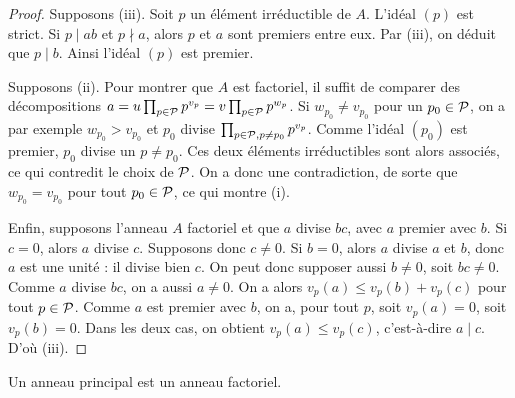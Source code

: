 \documentclass[]{report}
\begin{document}
\begin{proof}{}{}
    Supposons (iii). Soit $p$ un élément irréductible de $A$. L'idéal $(p)$ est strict. Si $p \mid ab$ et $p \nmid a$, alors $p$ et $a$ sont premiers entre eux. Par (iii), on déduit que $p \mid b$. Ainsi l'idéal $(p)$ est premier.

    Supposons (ii). Pour montrer que $A$ est factoriel, il suffit de comparer des décompositions $a = u \prod_{p \in \mathcal{P}} p^{v_p} = v \prod_{p \in \mathcal{P}} p^{w_p}$. Si $w_{p_0} \neq v_{p_0}$ pour un $p_0 \in \mathcal{P}$, on a par exemple $w_{p_0} > v_{p_0}$ et $p_0$ divise $\prod_{p \in \mathcal{P}, p \neq p_0} p^{v_p}$. Comme l'idéal $(p_0)$ est premier, $p_0$ divise un $p \neq p_0$. Ces deux éléments irréductibles sont alors associés, ce qui contredit le choix de $\mathcal{P}$. On a donc une contradiction, de sorte que $w_{p_0} = v_{p_0}$ pour tout $p_0 \in \mathcal{P}$, ce qui montre (i).

    Enfin, supposons l'anneau $A$ factoriel et que $a$ divise $bc$, avec $a$ premier avec $b$. Si $c = 0$, alors $a$ divise $c$. Supposons donc $c \neq 0$. Si $b = 0$, alors $a$ divise $a$ et $b$, donc $a$ est une unité : il divise bien $c$. On peut donc supposer aussi $b \neq 0$, soit $bc \neq 0$. Comme $a$ divise $bc$, on a aussi $a \neq 0$. On a alors $v_p(a) \le v_p(b) + v_p(c)$ pour tout $p \in \mathcal{P}$. Comme $a$ est premier avec $b$, on a, pour tout $p$, soit $v_p(a) = 0$, soit $v_p(b) = 0$. Dans les deux cas, on obtient $v_p(a) \le v_p(c)$, c'est-à-dire $a \mid c$. D'où (iii).
\end{proof}

\begin{tm}{}{}
    Un anneau principal est un anneau factoriel.
\end{tm}
\end{document}
